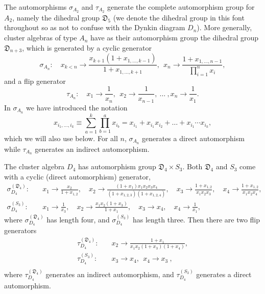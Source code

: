 \documentclass[11pt]{article}
\begin{document}
The automorphisms $\sigma_{A_2}$ and $\tau_{A_2}$ generate the complete automorphism group for $A_2$, namely the dihedral group ${\mathfrak D}_5$ (we denote the dihedral group in this font throughout so as not to confuse with the Dynkin diagram $D_n$). More generally, cluster algebras of type $A_n$ have as their automorphism group the dihedral group ${\mathfrak D}_{n+3}$, which is generated by a cyclic generator 
\begin{equation} \label{eq:def_An_automorphic_cycle}
  \sigma_{A_n}:\quad x_{k<n} \to \frac{x_{k+1}(1+x_{1,\ldots,k-1})}{1+x_{1,\ldots,k+1}},~~x_n\to\frac{1+x_{1,\ldots,n-1}}{\prod_{i=1}^n x_i} ,
\end{equation}
and a flip generator
\begin{equation} \label{eq:def_An_automorphic_flip}
  \tau_{A_n}: \quad x_1 \to \frac{1}{x_n},~~x_2 \to \frac{1}{x_{n-1}},~\ldots~,x_n\to\frac{1}{x_1}.
\end{equation}
In $\sigma_{A_n}$ we have introduced the notation
\begin{equation} \label{eq:compound_x_def}
	x_{i_1,\ldots, i_k} \equiv \sum_{a=1}^k \prod_{b=1}^a x_{i_b} = x_{i_1}+x_{i_1}x_{i_2} + \ldots + x_{i_1}\cdots x_{i_k},
\end{equation}
which we will also use below. For all $n$, $\sigma_{A_n}$ generates a direct automorphism while $\tau_{A_n}$ generates an indirect automorphism.

The cluster algebra $D_4$ has automorphism group ${\mathfrak D}_4\times S_3$. Both ${\mathfrak D}_4$ and $S_3$ come with a cyclic (direct automorphism) generator,
\vspace{.1cm}
\begin{align}
  \sigma^{({\mathfrak D}_4)}_{D_4}:\quad& 
    x_1\to\frac{x_2}{1+x_{1,2}}, \quad
    x_2\to\frac{\left(1+x_1\right)x_1 x_2 x_3 x_4}{\left(1+x_{1,2,3}\right) \left(1+x_{1,2,4}\right)}, \quad
    x_3\to\frac{1+x_{1,2}}{x_1 x_2 x_3}, \quad
    x_4\to\frac{1+x_{1,2}}{x_1 x_2 x_4},\nonumber \\[2ex]
  \sigma^{(S_3)}_{D_4}:\quad& 
    x_1\to \frac{1}{x_3}, \quad
    x_2\to \frac{x_1 x_2 \left(1+x_3\right)}{1+x_1}, \quad
    x_3\to x_4, \quad
    x_4\to \frac{1}{x_1} ,
\end{align}
where $\sigma^{({\mathfrak D}_4)}_{D_4}$ has length four, and $\sigma^{(S_3)}_{D_4}$ has length three. Then there are two flip generators
\vspace{.1cm}
\begin{equation}
\begin{split}
  \tau^{({\mathfrak D}_4)}_{D_4}:\quad& 
    x_2\to \frac{1+x_1}{x_1 x_2 \left(1+x_3\right) \left(1+x_4\right)}, \\[2ex]
  \tau^{(S_3)}_{D_4}:\quad& 
    x_3\to x_4,~~
    x_4\to x_3 \ , \\[1ex]
\end{split}  
\end{equation}
where $\tau^{({\mathfrak D}_4)}_{D_4}$ generates an indirect automorphism, and $\tau^{(S_3)}_{D_4}$ generates a direct automorphism.
\end{document}
